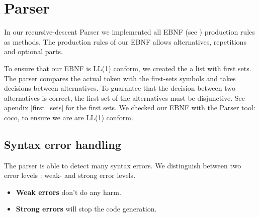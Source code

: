 \section{Parser}

In our recursive-descent Parser we implemented all EBNF (see \label{labelEBNF}) production rules as
methods. The production rules of our EBNF allows alternatives, repetitions and optional parts.

To ensure that our EBNF is LL(1) conform, we created the a list with first sets.
The parser compares the actual token with the first-sets symbols
and takes decisions between alternatives. 
To guarantee that the decision between two alternatives is correct, the first
set of the alternatives must be disjunctive. See apendix \ref{first_sets} for the first sets. We checked our EBNF with the Parser tool: coco, to
ensure we are are LL(1) conform. %




%


\subsection{Syntax error handling}
The parser is able to detect many syntax errors. We distinguish between two error levels : weak- and strong error levels.
\begin{itemize}
  \item \textbf{Weak errors} don't do any harm. 
  \item \textbf{Strong errors} will stop the code generation. 
\end{itemize}

